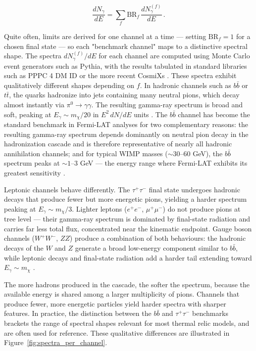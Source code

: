 \begin{equation}
	\frac{dN_\gamma}{dE} = \sum_f \text{BR}_f \, \frac{dN_\gamma^{(f)}}{dE} \,.
	\label{eq:spectrum_sum}
\end{equation}

Quite often, limits are derived for one channel at a time --- setting $\text{BR}_f = 1$ for a chosen final state --- so each "benchmark channel" maps to a distinctive spectral shape.
The spectra $dN_\gamma^{(f)}/dE$ for each channel are computed using Monte Carlo event generators such as Pythia, with the results tabulated in standard libraries such as PPPC 4 DM ID \cite{Cirelli:2010xx} or the more recent CosmiXs \cite{Arina:2023eic}.
These spectra exhibit qualitatively different shapes depending on $f$.
In hadronic channels such as $b\bar{b}$ or $t\bar{t}$, the quarks hadronize into jets containing many neutral pions, which decay almost instantly via $\pi^0 \to \gamma\gamma$.
The resulting gamma-ray spectrum is broad and soft, peaking at $E_\gamma \sim m_\chi / 20$ in $E^2 \, dN/dE$ units \cite{Cirelli:2024ssz}.
The $b\bar{b}$ channel has become the standard benchmark in Fermi-LAT analyses for two complementary reasons: the resulting gamma-ray spectrum depends dominantly on neutral pion decay in the hadronization cascade and is therefore representative of nearly all hadronic annihilation channels; and for typical WIMP masses ($\sim 30$--$60$ GeV), the $b\bar{b}$ spectrum peaks at $\sim 1$--$3$ GeV --- the energy range where Fermi-LAT exhibits its greatest sensitivity \cite{Hooper:2024}.

Leptonic channels behave differently.
The $\tau^+\tau^-$ final state undergoes hadronic decays that produce fewer but more energetic pions, yielding a harder spectrum peaking at $E_\gamma \sim m_\chi / 3$.
Lighter leptons ($e^+e^-$, $\mu^+\mu^-$) do not produce pions at tree level --- their gamma-ray spectrum is dominated by final-state radiation and carries far less total flux, concentrated near the kinematic endpoint.
Gauge boson channels ($W^+W^-$, $ZZ$) produce a combination of both behaviours: the hadronic decays of the $W$ and $Z$ generate a broad low-energy component similar to $b\bar{b}$, while leptonic decays and final-state radiation add a harder tail extending toward $E_\gamma \sim m_\chi$ \cite{Hooper:2024}.

The more hadrons produced in the cascade, the softer the spectrum, because the available energy is shared among a larger multiplicity of pions.
Channels that produce fewer, more energetic particles yield harder spectra with sharper features.
In practice, the distinction between the $b\bar{b}$ and $\tau^+\tau^-$ benchmarks brackets the range of spectral shapes relevant for most thermal relic models, and are often used for reference.
These qualitative differences are illustrated in Figure~\ref{fig:spectra_per_channel}.

